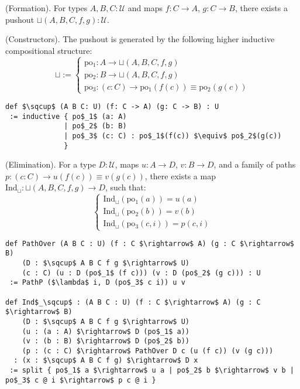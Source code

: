 \documentclass{article}
\begin{document}
\begin{definition} (Formation).
For types \( A, B, C : \mathcal{U} \) and maps \( f : C \to A \), \( g : C \to B \),
there exists a pushout \( \sqcup(A,B,C,f,g) : \mathcal{U} \).
\end{definition}

\begin{definition} (Constructors).
The pushout is generated by the following higher inductive compositional structure:
\[
\sqcup :=
\begin{cases}
\text{po$_1$} : A \to \sqcup(A,B,C,f,g) \\
\text{po$_2$} : B \to \sqcup(A,B,C,f,g) \\
\text{po$_3$} : (c : C) \to \text{po$_1$}(f(c)) \equiv \text{po$_2$}(g(c))
\end{cases}
\]
\begin{lstlisting}[mathescape=true]
def $\sqcup$ (A B C: U) (f: C -> A) (g: C -> B) : U
 := inductive { po$_1$ (a: A)
              | po$_2$ (b: B)
              | po$_3$ (c: C) : po$_1$(f(c)) $\equiv$ po$_2$(g(c))
              }
\end{lstlisting}
\end{definition}

\begin{theorem} (Elimination).
For a type \( D : \mathcal{U} \), maps \( u : A \to D \), \( v : B \to D \),
and a family of paths \( p : (c : C) \to u(f(c)) \equiv v(g(c)) \),
there exists a map \( \text{Ind}_\sqcup : \sqcup(A,B,C,f,g) \to D \), such that:
\[
\begin{cases}
\text{Ind}_\sqcup(\text{po$_1$}(a)) = u(a) \\
\text{Ind}_\sqcup(\text{po$_2$}(b)) = v(b) \\
\text{Ind}_\sqcup(\text{po$_3$}(c,i)) = p(c,i)
\end{cases}
\]
\begin{lstlisting}[mathescape=true]
def PathOver (A B C : U) (f : C $\rightarrow$ A) (g : C $\rightarrow$ B)
    (D : $\sqcup$ A B C f g $\rightarrow$ U)
    (c : C) (u : D (po$_1$ (f c))) (v : D (po$_2$ (g c))) : U
 := PathP ($\lambda$ i, D (po$_3$ c i)) u v

def Ind$_\sqcup$ : (A B C : U) (f : C $\rightarrow$ A) (g : C $\rightarrow$ B)
    (D : $\sqcup$ A B C f g $\rightarrow$ U)
    (u : (a : A) $\rightarrow$ D (po$_1$ a))
    (v : (b : B) $\rightarrow$ D (po$_2$ b))
    (p : (c : C) $\rightarrow$ PathOver D c (u (f c)) (v (g c)))
  : (x : $\sqcup$ A B C f g) $\rightarrow$ D x
 := split { po$_1$ a $\rightarrow$ u a | po$_2$ b $\rightarrow$ v b | po$_3$ c @ i $\rightarrow$ p c @ i }
\end{lstlisting}
\end{theorem}
\end{document}
